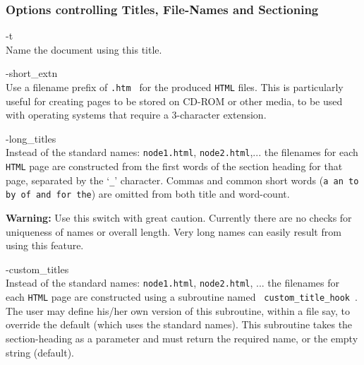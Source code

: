 \subsubsection{Options controlling Titles, File-Names and Sectioning}
%
%
%
%
\begin{htmllist}%
\item [ -t \Meta{top-page-title}\label{cs_toppagetitle}]
\\
Name the document using this title.

%

\item [ -short\_extn\label{cs_shortextn}]
\\
Use a filename prefix of \texttt{.htm } for the produced
\texttt{HTML} files. This is particularly useful for creating pages
to be stored on CD-ROM or other media, to be used with 
operating systems that require a 3-character extension.%


\item [ -long\_titles \Meta{num}\label{cs_longtitles}]
\\
Instead of the standard  names: \texttt{node1.html}, \texttt{node2.html},... 
the filenames for each \texttt{HTML} page are constructed
from the first  words of the section heading
for that page, separated by the `\texttt{\_}' character.\html{\\}
Commas and common short words (\texttt{a an to by of and for the})
are omitted from both title and word-count.

\smallskip\noindent
\textbf{Warning:} Use this switch with great caution.
Currently there are no checks for uniqueness of names or overall length. 
Very long names can easily result from using this feature.%

%

\item [ -custom\_titles\label{cs_customtitles}]
\\
Instead of the standard  names: \texttt{node1.html}, \texttt{node2.html}, ... 
the filenames for each \texttt{HTML} page are constructed using a \Perl{}
subroutine named \texttt{ custom\_title\_hook}~. 
The user may define his/her own version of this subroutine, 
within a  file say, 
to override the default (which uses the standard names).
This subroutine takes the section-heading as a parameter 
and must return the required name, or the empty string (default).


\end{htmllist}
